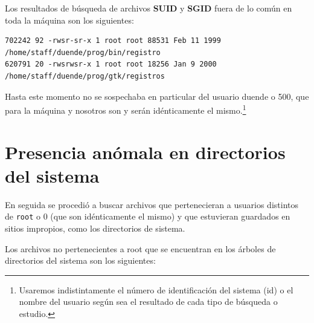 Los resultados de búsqueda de archivos \textbf{SUID} y \textbf{SGID} fuera de lo común en toda la máquina
son los siguientes:
\vspace{1em}

\begin{lstlisting}[style=terminal]
702242 92 -rwsr-sr-x 1 root root 88531 Feb 11 1999 /home/staff/duende/prog/bin/registro
620791 20 -rwsrwsr-x 1 root root 18256 Jan 9 2000 /home/staff/duende/prog/gtk/registros
\end{lstlisting}

\vspace{1em}
Hasta este momento no se sospechaba en particular del usuario duende o 500, que
para la máquina y nosotros son y serán idénticamente el mismo.\footnote{
Usaremos indistintamente el número de identificación del sistema (id) o el
nombre del usuario según sea el resultado de cada tipo de búsqueda o
estudio.} 

\section{Presencia anómala en directorios del sistema}

En seguida se procedió a buscar archivos que pertenecieran a usuarios distintos de \texttt{root} o 0 (que son idénticamente el mismo) y que
estuvieran guardados en sitios impropios, como los directorios de
sistema.

Los archivos no pertenecientes a root que se encuentran en los árboles
de directorios del sistema son los siguientes:
\vspace{3mm}


